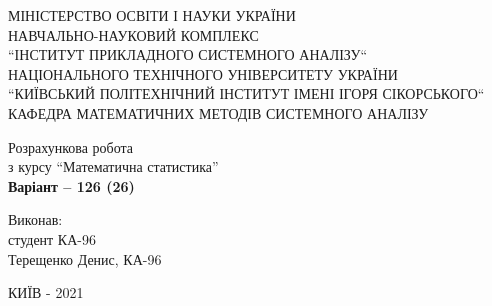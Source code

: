 \documentclass[14pt,a4paper]{scrartcl}
\theoremstyle{definition}
\theoremstyle{remark}
\theoremstyle{definition}
\theoremstyle{definition}
\begin{document}
\begin{titlepage}
\centering
	\vspace{1cm}
	{ МІНІСТЕРСТВО ОСВІТИ І НАУКИ УКРАЇНИ\\
  НАВЧАЛЬНО-НАУКОВИЙ КОМПЛЕКС\\
  ``ІНСТИТУТ ПРИКЛАДНОГО СИСТЕМНОГО АНАЛІЗУ``\\
  НАЦІОНАЛЬНОГО ТЕХНІЧНОГО УНІВЕРСИТЕТУ УКРАЇНИ\\
  ``КИЇВСЬКИЙ ПОЛІТЕХНІЧНИЙ ІНСТИТУТ ІМЕНІ ІГОРЯ СІКОРСЬКОГО``\\
  КАФЕДРА МАТЕМАТИЧНИХ МЕТОДІВ  СИСТЕМНОГО АНАЛІЗУ\\\par}
	\vspace{5cm}
	{\large Розрахункова робота \\
	з курсу ``Математична статистика''
  \\
  \textbf{Варіант -- 126 (26)}
  \par}
	\vfill
  \begin{flushright}
  Виконав:\\
	студент КА-96\\
   Терещенко Денис, КА-96\\
  \end{flushright}


	\vfill

	{\large КИЇВ - 2021 \par}
\end{titlepage}
\end{document}
